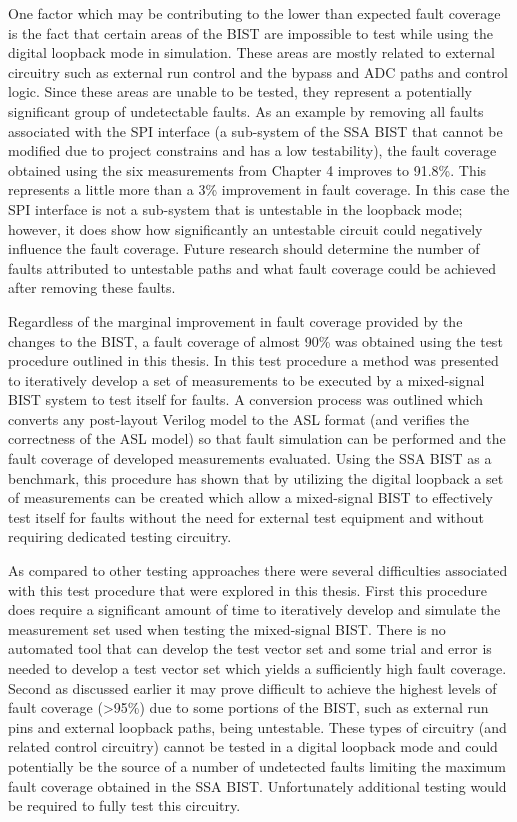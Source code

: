 \documentclass[12pt]{report}
\begin{document}
One factor which may be contributing to the lower than expected fault coverage is the fact that certain areas of the BIST are impossible to test while using the digital loopback mode in simulation.  These areas are mostly related to external circuitry such as external run control and the bypass and ADC paths and control logic.  Since these areas are unable to be tested, they represent a potentially significant group of undetectable faults. As an example by removing all faults associated with the SPI interface (a sub-system of the SSA BIST that cannot be modified due to project constrains and has a low testability), the fault coverage obtained using the six measurements from Chapter 4 improves to 91.8\%.  This represents a little more than a 3\% improvement in fault coverage.  In this case the SPI interface is not a sub-system that is untestable in the loopback mode; however, it does show how significantly an untestable circuit could negatively influence the fault coverage. Future research should determine the number of faults attributed to untestable paths and what fault coverage could be achieved after removing these faults.  

Regardless of the marginal improvement in fault coverage provided by the changes to the BIST, a fault coverage of almost 90\% was obtained using the test procedure outlined in this thesis.  In this test procedure a method was presented to iteratively develop a set of measurements to be executed by a mixed-signal BIST system to test itself for faults.  A conversion process was outlined which converts any post-layout Verilog model to the ASL format (and verifies the correctness of the ASL model) so that fault simulation can be performed and the fault coverage of developed measurements evaluated.  Using the SSA BIST as a benchmark, this procedure has shown that by utilizing the digital loopback a set of measurements can be created which allow a mixed-signal BIST to effectively test itself for faults without the need for external test equipment and without requiring dedicated testing circuitry.  

As compared to other testing approaches there were several difficulties associated with this test procedure that were explored in this thesis.  First this procedure does require a significant amount of time to iteratively develop and simulate the measurement set used when testing the mixed-signal BIST.  There is no automated tool that can develop the test vector set and some trial and error is needed to develop a test vector set which yields a sufficiently high fault coverage.  Second as discussed earlier it may prove difficult to achieve the highest levels of fault coverage (\textgreater 95\%) due to some portions of the BIST, such as external run pins and external loopback paths, being untestable.  These types of circuitry (and related control circuitry) cannot be tested in a digital loopback mode and could potentially be the source of a number of undetected faults limiting the maximum fault coverage obtained in the SSA BIST.  Unfortunately additional testing would be required to fully test this circuitry.
\end{document}
